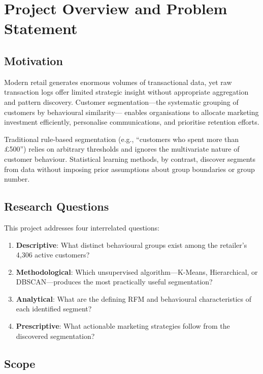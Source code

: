 \documentclass[12pt,a4paper]{article}
\begin{document}
\section{Project Overview and Problem Statement}

\subsection{Motivation}

Modern retail generates enormous volumes of transactional data, yet raw transaction logs
offer limited strategic insight without appropriate aggregation and pattern discovery.
Customer segmentation---the systematic grouping of customers by behavioural similarity---
enables organisations to allocate marketing investment efficiently, personalise
communications, and prioritise retention efforts.

Traditional rule-based segmentation (e.g., ``customers who spent more than \pounds500'')
relies on arbitrary thresholds and ignores the multivariate nature of customer behaviour.
Statistical learning methods, by contrast, discover segments from data without imposing
prior assumptions about group boundaries or group number.

\subsection{Research Questions}

This project addresses four interrelated questions:
\begin{enumerate}[leftmargin=*]
  \item \textbf{Descriptive}: What distinct behavioural groups exist among the retailer's
        4,306 active customers?
  \item \textbf{Methodological}: Which unsupervised algorithm---K-Means, Hierarchical, or
        DBSCAN---produces the most practically useful segmentation?
  \item \textbf{Analytical}: What are the defining RFM and behavioural characteristics of
        each identified segment?
  \item \textbf{Prescriptive}: What actionable marketing strategies follow from the
        discovered segmentation?
\end{enumerate}

\subsection{Scope}
\end{document}
